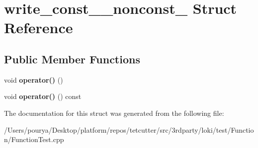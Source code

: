 \hypertarget{structwrite__const__1__nonconst__2}{}\section{write\+\_\+const\+\_\+\_\+nonconst\+\_ Struct Reference}
\label{structwrite__const__1__nonconst__2}
\subsection*{Public Member Functions}
\begin{DoxyCompactItemize}
\item 
\hypertarget{structwrite__const__1__nonconst__2_af96284083a209accf9a63c8bbaf8cfbe}{}void {\bfseries operator()} ()\label{structwrite__const__1__nonconst__2_af96284083a209accf9a63c8bbaf8cfbe}

\item 
\hypertarget{structwrite__const__1__nonconst__2_abf38e000cfcd19e29ac73be2052b1fa4}{}void {\bfseries operator()} () const \label{structwrite__const__1__nonconst__2_abf38e000cfcd19e29ac73be2052b1fa4}

\end{DoxyCompactItemize}


The documentation for this struct was generated from the following file\+:\begin{DoxyCompactItemize}
\item 
/\+Users/pourya/\+Desktop/platform/repos/tetcutter/src/3rdparty/loki/test/\+Function/Function\+Test.\+cpp\end{DoxyCompactItemize}
